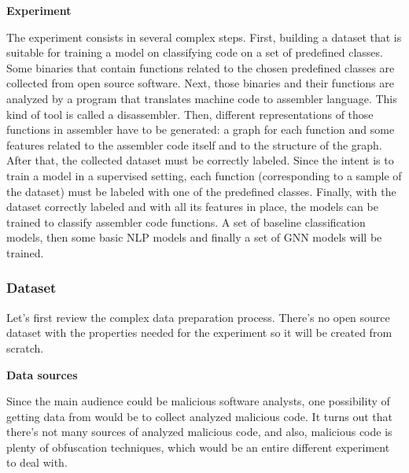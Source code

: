\textbf{Experiment}

The experiment consists in several complex steps.
First, building a dataset that is suitable for training a model on classifying code on a set of predefined classes. Some binaries that contain functions related to the chosen predefined classes are collected from open source software.  
Next, those binaries and their functions are analyzed by a program that translates machine code to assembler language. This kind of tool is called a disassembler.
Then, different representations of those functions in assembler have to be generated: a graph for each function and some features related to the assembler code itself and to the structure of the graph.
After that, the collected dataset must be correctly labeled. Since the intent is to train a model in a supervised setting, each function (corresponding to a sample of the dataset) must be labeled with one of the predefined classes.
Finally, with the dataset correctly labeled and with all its features in place, the models can be trained to classify assembler code functions. A set of baseline classification models, then some basic NLP models and finally a set of GNN models will be trained. 



\subsubsection{Dataset}

Let's first review the complex data preparation process. There's no open source dataset with the properties needed for the experiment so it will be created from scratch.



\textbf{Data sources}

Since the main audience could be malicious software analysts, one possibility of getting data from would be to collect analyzed malicious code. It turns out that there's not many sources of analyzed malicious code, and also, malicious code is plenty of obfuscation techniques, which would be an entire different experiment to deal with. 

